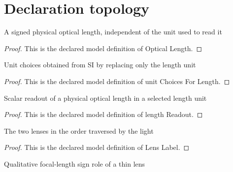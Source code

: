\section{Declaration topology}
\begin{definition}
  \label{def:physics:phyx-mini-0134:phyxminiproblems-problemphyxmini0134-opticallength}
  A signed physical optical length, independent of the unit used to read it
\end{definition}
\begin{proof}
  This is the declared model definition of Optical Length.
\end{proof}
\begin{definition}
  \label{def:physics:phyx-mini-0134:phyxminiproblems-problemphyxmini0134-unitchoicesforlength}
  Unit choices obtained from SI by replacing only the length unit
\end{definition}
\begin{proof}
  This is the declared model definition of unit Choices For Length.
\end{proof}
\begin{definition}
  \label{def:physics:phyx-mini-0134:phyxminiproblems-problemphyxmini0134-lengthreadout}
  Scalar readout of a physical optical length in a selected length unit
\end{definition}
\begin{proof}
  This is the declared model definition of length Readout.
\end{proof}
\begin{definition}
  \label{def:physics:phyx-mini-0134:phyxminiproblems-problemphyxmini0134-lenslabel}
  The two lenses in the order traversed by the light
\end{definition}
\begin{proof}
  This is the declared model definition of Lens Label.
\end{proof}
\begin{definition}
  \label{def:physics:phyx-mini-0134:phyxminiproblems-problemphyxmini0134-thinlenskind}
  Qualitative focal-length sign role of a thin lens
\end{definition}
